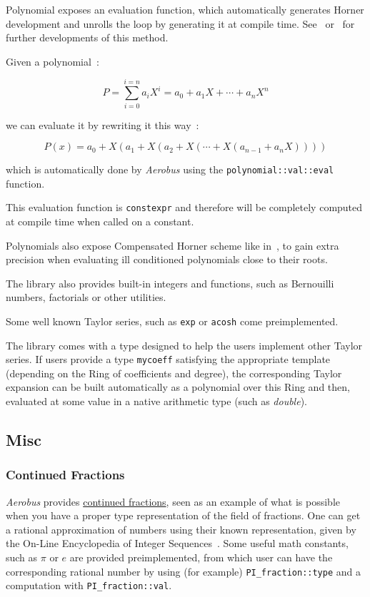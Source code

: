 \documentclass[twocolumn, switch]{article}
\begin{document}
Polynomial exposes an evaluation function, which automatically generates Horner development and unrolls the loop by generating it at compile time. See~\cite{horner1815new} or~\cite{knuth2014art} for further developments of this method.

Given a polynomial~:

\[P = \sum_{i=0}^{i = n}a_{i}X^i = a_0 + a_1X + \cdots + a_{n}X^n\]

we can evaluate it by rewriting it this way~:

\[P(x) = a_0 + X (a_1 + X (a_2 + X(\cdots + X(a_{n-1} + a_{n}X))))\]

which is automatically done by \textit{Aerobus} using the \lstinline{polynomial::val::eval} function.

This evaluation function is \lstinline{constexpr} and therefore will be completely computed at compile time when called on a constant.

Polynomials also expose Compensated Horner scheme like in~\cite{graillat2006compensated}, to gain extra precision when evaluating ill conditioned polynomials close to their roots.

The library also provides built-in integers and functions, such as Bernouilli numbers, factorials or other utilities.

Some well known Taylor series, such as \lstinline{exp} or \lstinline{acosh} come preimplemented.

The library comes with a type designed to help the users implement other Taylor series.
If users provide a type \lstinline{mycoeff} satisfying the appropriate template (depending on the Ring of coefficients and degree), the corresponding Taylor expansion can be built automatically as a polynomial over this Ring and then, evaluated at some value in a native arithmetic type (such as \textit{double}).

\subsection{Misc}

\subsubsection{Continued Fractions}

\textit{Aerobus} provides \href{https://en.wikipedia.org/wiki/Continued_fraction}{continued fractions}, seen as an example of what is possible when you have a proper type representation of the field of fractions.
One can get a rational approximation of numbers using their known representation, given by the On-Line Encyclopedia of Integer Sequences~\cite{OEIS}.
Some useful math constants, such as $\pi$ or $e$ are provided preimplemented, from which user can have the corresponding rational number by using (for example) \lstinline{PI_fraction::type} and a computation with \lstinline{PI_fraction::val}.
\end{document}
